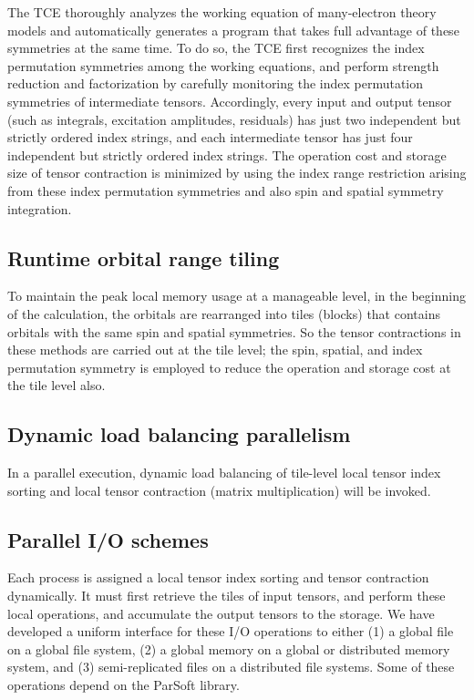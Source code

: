 The TCE thoroughly analyzes the working equation of many-electron theory models and 
automatically generates a program that takes full advantage of these symmetries at the same time.
To do so, the TCE first recognizes the index permutation symmetries among the working equations,
and perform strength reduction and factorization by carefully monitoring the index permutation
symmetries of intermediate tensors.  Accordingly, every input and output tensor (such as 
integrals, excitation amplitudes, residuals) has just two independent but strictly ordered index strings,
and each intermediate tensor has just four independent but strictly ordered index strings.
The operation cost and storage size of tensor contraction is minimized by using the index range 
restriction arising from these
index permutation symmetries and also spin and spatial symmetry integration.

\subsection{Runtime orbital range tiling}

To maintain the peak local memory usage at a manageable level, in the beginning of the calculation,
the orbitals are rearranged into tiles (blocks) that contains orbitals with the same spin and spatial
symmetries.  So the tensor contractions in these methods are carried out at the tile level; the spin,
spatial, and index permutation symmetry is employed to reduce the operation and storage cost at the tile 
level also.

\subsection{Dynamic load balancing parallelism}

In a parallel execution, dynamic load balancing of tile-level local tensor index sorting and local 
tensor contraction (matrix multiplication) will be invoked.

\subsection{Parallel I/O schemes}

Each process is assigned a local tensor index sorting and tensor contraction dynamically.  It must first
retrieve the tiles of input tensors, and perform these local operations, and accumulate the output
tensors to the storage.  We have developed a uniform interface for these I/O operations to either
(1) a global file on a global file system, (2) a global memory on a global or distributed memory system,
and (3) semi-replicated files on a distributed file systems.  Some of these operations depend on 
the ParSoft library.

